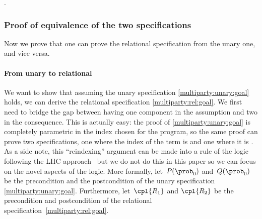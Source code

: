 \documentclass[acmsmall,nonacm,screen,appendix]{acmart}
\begin{document}
\begin{eqexplain}
{   }
  \whichproves
\CC{\hat\prob} .
  \whichproves
{}
\end{eqexplain}


\subsubsection{Proof of equivalence of the two specifications}

Now we prove that one can prove the relational specification from the unary one,
and vice versa.


\paragraph{From unary to relational}
We want to show that
assuming the unary specification \eqref{multiparty:unary:goal} holds,
we can derive the relational specification \eqref{multiparty:rel:goal}.
We first need to bridge the gap between having one component
in the assumption and two in the consequence.
This is actually easy: the proof of \eqref{multiparty:unary:goal} is
completely parametric in the index chosen for the program,
so the same proof can prove two specifications, one where the index of the term is  and one where it is .
As a side note, this ``reindexing'' argument can be made into a rule of the logic following the LHC approach~\cite{d2022proving} but we do not do this
in this paper so we can focus on the novel aspects of the logic.
More formally, let~$P(\prob_0)$ and~$Q(\prob_0)$ be the precondition and the postcondition
of the unary specification \eqref{multiparty:unary:goal}.
Furthermore, let~$ \cpl{R_1} $ and $ \cpl{R_2} $ be the precondition and postcondition of the relational specification~\eqref{multiparty:rel:goal}.
\end{document}
